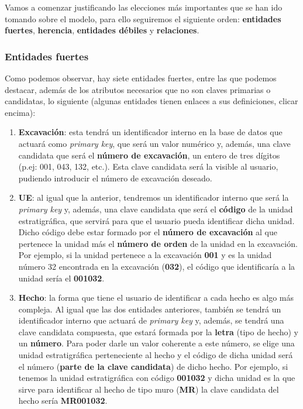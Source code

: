     Vamos a comenzar justificando las elecciones más importantes que se han ido tomando
    sobre el modelo, para ello seguiremos el siguiente orden: \textbf{entidades fuertes},
    \textbf{herencia}, \textbf{entidades débiles} y \textbf{relaciones}.

    \subsubsection{Entidades fuertes}
    Como podemos observar, hay siete entidades fuertes, entre las que podemos destacar,
    además de los atributos necesarios que no son claves primarias o candidatas,
    lo siguiente (algunas entidades tienen enlaces a sus definiciones, clicar encima):

    \begin{enumerate}
        \item \textbf{Excavación}: esta tendrá un identificador interno en la base de
        datos que actuará como \textit{primary key}, que será un valor numérico y, además,
        una clave candidata que será el \textbf{número de excavación}, un entero de tres dígitos
        (p.ej: 001, 043, 132, etc.). Esta clave candidata será la visible al usuario, pudiendo
        introducir el número de excavación deseado.

        \item \textbf{\gls{UE}}: al igual que la anterior, tendremos un
        identificador interno que será la \textit{primary key} y, además, una clave candidata
        que será el \textbf{código} de la unidad estratigráfica, que servirá para que el
        usuario pueda identificar dicha unidad. Dicho código debe estar formado por el
        \textbf{número de excavación} al que pertenece la unidad más el \textbf{número de orden}
        de la unidad en la excavación. Por ejemplo, si la unidad pertenece a la excavación
        \textbf{001} y es la unidad número 32 encontrada en la excavación (\textbf{032}), el
        código que identificaría a la unidad sería el \textbf{001032}.

        \item \textbf{\gls{Hecho}}: la forma que tiene el usuario de identificar a cada hecho es algo
        más compleja. Al igual que las dos entidades anteriores, también se tendrá un
        identificador interno que actuará de \textit{primary key} y, además, se tendrá una clave
        candidata compuesta, que estará formada por la \textbf{letra} (tipo de hecho) y un
        \textbf{número}. Para poder darle un valor coherente a este número, se elige una
        unidad estratigráfica perteneciente al hecho y el código de dicha unidad será el
        número (\textbf{parte de la clave candidata}) de dicho hecho. Por ejemplo, si tenemos
        la unidad estratigráfica con código \textbf{001032} y dicha unidad es la que sirve
        para identificar al hecho de tipo muro (\textbf{MR}) la clave candidata del hecho
        sería \textbf{MR001032}.


\end{enumerate}
